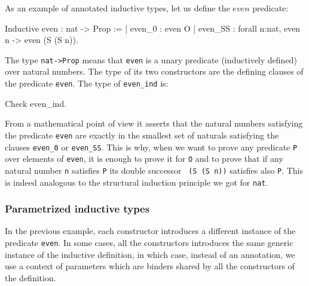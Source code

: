 As an example of annotated inductive types, let us define the
$even$ predicate:

\begin{coq_example}
Inductive even : nat -> Prop :=
  | even_0 : even O
  | even_SS : forall n:nat, even n -> even (S (S n)).
\end{coq_example}

The type {\tt nat->Prop} means that {\tt even} is a unary predicate
(inductively defined) over natural numbers.  The type of its two
constructors are the defining clauses of the predicate {\tt even}. The
type of {\tt even\_ind} is:

\begin{coq_example}
Check even_ind.
\end{coq_example}

From a mathematical point of view it asserts that the natural numbers
satisfying the predicate {\tt even} are exactly in the smallest set of
naturals satisfying the clauses {\tt even\_0} or {\tt even\_SS}. This
is why, when we want to prove any predicate {\tt P} over elements of
{\tt even}, it is enough to prove it for {\tt O} and to prove that if
any natural number {\tt n} satisfies {\tt P} its double successor {\tt
  (S (S n))} satisfies also {\tt P}. This is indeed analogous to the
structural induction principle we got for {\tt nat}.

\begin{ErrMsgs}
\item {}
\item {}
\end{ErrMsgs}

\subsubsection{Parametrized inductive types}
In the previous example, each constructor introduces a
different instance of the predicate {\tt even}. In some cases, 
all the constructors introduces the same generic instance of the
inductive definition, in which case, instead of an annotation, we use
a context of parameters which are binders shared by all the
constructors of the definition.


